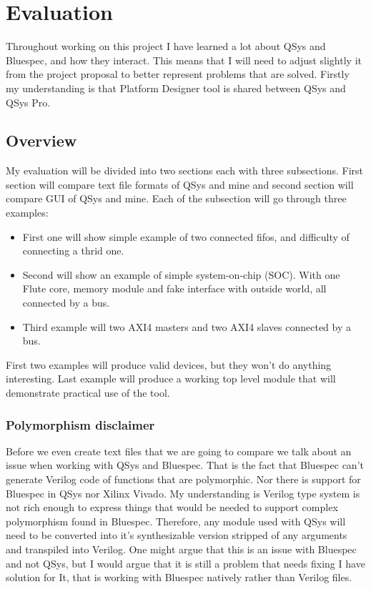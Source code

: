\documentclass[12pt]{report}
\begin{document}
\chapter{Evaluation}
Throughout working on this project I have learned a lot about QSys and Bluespec, and how they interact. This means that I will need to adjust slightly it from the project proposal to better represent problems that are solved. Firstly my understanding is that Platform Designer tool is shared between QSys and QSys Pro.

\section{Overview}
My evaluation will be divided into two sections each with three subsections. First section will compare text file formats of QSys and mine and second section will compare GUI of QSys and mine.
Each of the subsection will go through three examples:
\begin{itemize}
    \item First one will show simple example of two connected fifos, and difficulty of connecting a thrid one.
    \item Second will show an example of simple system-on-chip (SOC). With one Flute core, memory module and fake interface with outside world, all connected by a bus.
    \item Third example will two AXI4 masters and two AXI4 slaves connected by a bus. 
\end{itemize}
First two examples will produce valid devices, but they won't do anything interesting. Last example will produce a working top level module that will demonstrate practical use of the tool.

\subsection{Polymorphism disclaimer}
Before we even create text files that we are going to compare we talk about an issue when working with QSys and Bluespec. That is the fact that Bluespec can't generate Verilog code of functions that are polymorphic. Nor there is support for Bluespec in QSys nor Xilinx Vivado. My understanding is Verilog type system is not rich enough to express things that would be needed to support complex polymorphism found in Bluespec. Therefore, any module used with QSys will need to be converted into it's synthesizable version stripped of any arguments and transpiled into Verilog. One might argue that this is an issue with Bluespec and not QSys, but I would argue that it is still a problem that needs fixing I have solution for It, that is working with Bluespec natively rather than Verilog files. 
\end{document}
